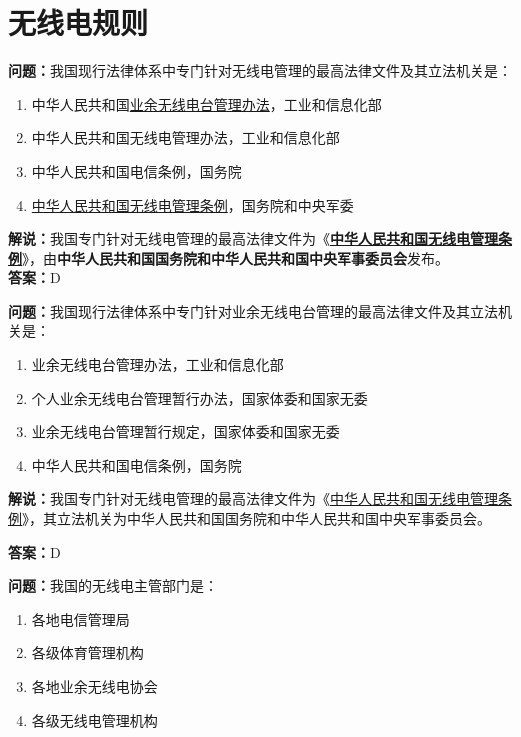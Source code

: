\chapter{无线电规则}

\textbf{问题：}我国现行法律体系中专门针对无线电管理的最高法律文件及其立法机关是：

\begin{enumerate}[label=\Alph*), leftmargin=1.5cm]
	\item 中华人民共和国\href{https://www.miit.gov.cn/jgsj/zfs/bmgz/art/2020/art_147b69815b3641caad9047735f94c860.html}{业余无线电台管理办法}，工业和信息化部
	\item 中华人民共和国无线电管理办法，工业和信息化部
	\item 中华人民共和国电信条例，国务院
	\item \href{http://www.gov.cn/zhengce/content/2016-11/25/content_5137687.htm}{中华人民共和国无线电管理条例}，国务院和中央军委
\end{enumerate}

\textbf{解说：}我国专门针对无线电管理的最高法律文件为《\textbf{\href{http://www.gov.cn/zhengce/content/2016-11/25/content_5137687.htm}{中华人民共和国无线电管理条例}}》，由\textbf{中华人民共和国国务院和中华人民共和国中央军事委员会}发布。\\\textbf{答案：}D


\textbf{问题：}我国现行法律体系中专门针对业余无线电台管理的最高法律文件及其立法机关是：

\begin{enumerate}[label=\Alph*), leftmargin=1.5cm]
	\item 业余无线电台管理办法，工业和信息化部
	\item 个人业余无线电台管理暂行办法，国家体委和国家无委
	\item 业余无线电台管理暂行规定，国家体委和国家无委
	\item 中华人民共和国电信条例，国务院
\end{enumerate}

\textbf{解说：}我国专门针对无线电管理的最高法律文件为《\href{http://www.gov.cn/zhengce/content/2016-11/25/content_5137687.htm}{中华人民共和国无线电管理条例}》，其立法机关为中华人民共和国国务院和中华人民共和国中央军事委员会。

\textbf{答案：}D


\textbf{问题：}我国的无线电主管部门是：

\begin{enumerate}[label=\Alph*), leftmargin=1.5cm]
	\item 各地电信管理局
	\item 各级体育管理机构
	\item 各地业余无线电协会
	\item 各级无线电管理机构
\end{enumerate}

